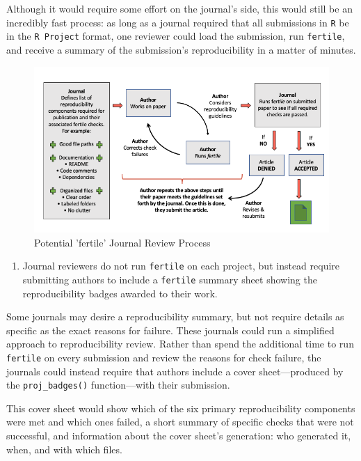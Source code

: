 \documentclass[12pt,twoside]{reedthesis}
\providecommand{\tightlist}{%
  \setlength{\itemsep}{0pt}\setlength{\parskip}{0pt}}
\begin{document}
Although it would require some effort on the journal's side, this would still be an incredibly fast process: as long as a journal required that all submissions in \texttt{R} be in the \texttt{R\ Project} format, one reviewer could load the submission, run \texttt{fertile}, and receive a summary of the submission's reproducibility in a matter of minutes.
\begin{figure}
\includegraphics[width=1\linewidth]{figure/journal-process} \caption{Potential 'fertile' Journal Review Process}\label{fig:unnamed-chunk-63}
\end{figure}
\begin{enumerate}
\def\labelenumi{\arabic{enumi}.}
\setcounter{enumi}{1}
\tightlist
\item
  Journal reviewers do not run \texttt{fertile} on each project, but instead require submitting authors to include a \texttt{fertile} summary sheet showing the reproducibility badges awarded to their work.
\end{enumerate}
Some journals may desire a reproducibility summary, but not require details as specific as the exact reasons for failure. These journals could run a simplified approach to reproducibility review. Rather than spend the additional time to run \texttt{fertile} on every submission and review the reasons for check failure, the journals could instead require that authors include a cover sheet---produced by the \texttt{proj\_badges()} function---with their submission.

This cover sheet would show which of the six primary reproducibility components were met and which ones failed, a short summary of specific checks that were not successful, and information about the cover sheet's generation: who generated it, when, and with which files.
\end{document}
